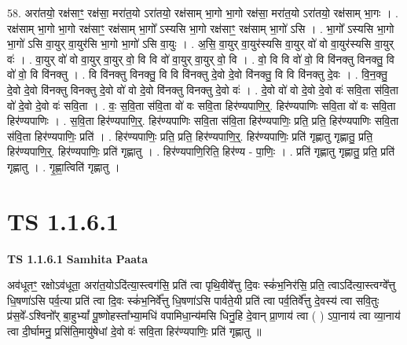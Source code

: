 \documentclass[17pt]{extarticle}
\begin{document}
58. अरा॑तयो॒ रक्ष॑साꣳ॒॒ रक्ष॑सा॒ मरा॑त॒यो ऽरा॑तयो॒ रक्ष॑साम् भा॒गो भा॒गो रक्ष॑सा॒ मरा॑त॒यो ऽरा॑तयो॒ रक्ष॑साम् भा॒गः । . रक्ष॑साम् भा॒गो भा॒गो रक्ष॑साꣳ॒॒ रक्ष॑साम् भा॒गो᳚ ऽस्यसि भा॒गो रक्ष॑साꣳ॒॒ रक्ष॑साम् भा॒गो॑ ऽसि । . भा॒गो᳚ ऽस्यसि भा॒गो भा॒गो॑ ऽसि वा॒युर् वा॒युर॑सि भा॒गो भा॒गो॑ ऽसि वा॒युः । . अ॒सि॒ वा॒युर् वा॒युर॑स्यसि वा॒युर् वो॑ वो वा॒युर॑स्यसि वा॒युर् वः॑ । . वा॒युर् वो॑ वो वा॒युर् वा॒युर् वो॒ वि वि वो॑ वा॒युर् वा॒युर् वो॒ वि । . वो॒ वि वि वो॑ वो॒ वि वि॑नक्तु विनक्तु॒ वि वो॑ वो॒ वि वि॑नक्तु । . वि वि॑नक्तु विनक्तु॒ वि वि वि॑नक्तु दे॒वो दे॒वो वि॑नक्तु॒ वि वि वि॑नक्तु दे॒वः । . वि॒न॒क्तु॒ दे॒वो दे॒वो वि॑नक्तु विनक्तु दे॒वो वो॑ वो दे॒वो वि॑नक्तु विनक्तु दे॒वो वः॑ । . दे॒वो वो॑ वो दे॒वो दे॒वो वः॑ सवि॒ता स॑वि॒ता वो॑ दे॒वो दे॒वो वः॑ सवि॒ता । . वः॒ स॒वि॒ता स॑वि॒ता वो॑ वः सवि॒ता हिर॑ण्यपाणि॒र्॒. हिर॑ण्यपाणिः सवि॒ता वो॑ वः सवि॒ता हिर॑ण्यपाणिः । . स॒वि॒ता हिर॑ण्यपाणि॒र्॒. हिर॑ण्यपाणिः सवि॒ता स॑वि॒ता हिर॑ण्यपाणिः॒ प्रति॒ प्रति॒ हिर॑ण्यपाणिः सवि॒ता स॑वि॒ता हिर॑ण्यपाणिः॒ प्रति॑ । . हिर॑ण्यपाणिः॒ प्रति॒ प्रति॒ हिर॑ण्यपाणि॒र्॒. हिर॑ण्यपाणिः॒ प्रति॑ गृह्णातु गृह्णातु॒ प्रति॒ हिर॑ण्यपाणि॒र्॒. हिर॑ण्यपाणिः॒ प्रति॑ गृह्णातु । . हिर॑ण्यपाणि॒रिति॒ हिर॑ण्य - पा॒णिः॒ । . प्रति॑ गृह्णातु गृह्णातु॒ प्रति॒ प्रति॑ गृह्णातु । . गृ॒ह्णा॒त्विति॑ गृह्णातु । \newline
\pagebreak
{}
\section*{ TS 1.1.6.1 }

\textbf{TS 1.1.6.1 } \newline
\textbf{Samhita Paata} \newline

अव॑धूतꣳ॒॒ रक्षोऽव॑धूता॒ अरा॑त॒योऽदि॑त्या॒स्त्वग॑सि॒ प्रति॑ त्वा पृथि॒वीवे᳚त्तु दि॒वः स्कं॑भ॒निर॑सि॒ प्रति॒ त्वाऽदि॑त्या॒स्त्वग्वे᳚त्तु धि॒षणा॑ऽसि पर्व॒त्या प्रति॑ त्वा दि॒वः स्कं॑भ॒निर्वे᳚त्तु धि॒षणा॑ऽसि पार्वते॒यी प्रति॑ त्वा पर्व॒तिर्वे᳚त्तु दे॒वस्य॑ त्वा सवि॒तुः प्र॑स॒वे᳚-ऽश्विनो᳚र् बा॒हुभ्यां᳚ पू॒ष्णोहस्ता᳚भ्या॒मधि॑ वपामिधा॒न्य॑मसि धिनु॒हि दे॒वान् प्रा॒णाय॑ त्वा ( ) ऽपा॒नाय॑ त्वा व्या॒नाय॑ त्वा दी॒र्घामनु॒ प्रसि॑ति॒मायु॑षेधां दे॒वो वः॑ सवि॒ता हिर॑ण्यपाणिः॒ प्रति॑ गृह्णातु ॥ \newline
\end{document}
